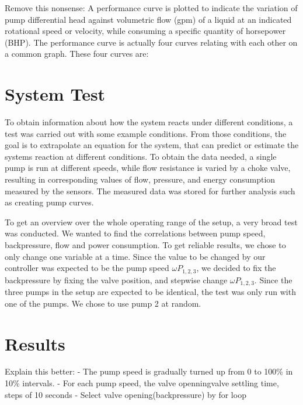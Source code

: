 
Remove this nonsense:
A performance curve is plotted to indicate the variation of pump differential head against volumetric flow (gpm) of a liquid at an indicated rotational speed or velocity, while consuming a specific quantity of horsepower (BHP). The performance curve is actually four curves relating with each other on a common graph. These four curves are:

\section{System Test}\label{sec:system_test} 
To obtain information about how the system reacts under different conditions,
a test was carried out with some example conditions.
From those conditions, the goal is to extrapolate an equation for the system,
that can predict or estimate  the systems reaction at different conditions.
To obtain the data needed,
a single pump is run at different speeds,
while flow resistance is varied by a choke valve,
resulting in corresponding values of flow, pressure, and energy consumption
measured by the sensors.
The measured data was stored for further analysis such as creating pump curves.

To get an overview over the whole operating range of the setup,
a very broad test was conducted.
We wanted to find the correlations between pump speed, backpressure, flow and power consumption.
To get reliable results, we chose to only change one variable at a time.
Since the value to be changed by our controller was expected to be the pump speed $\omega P_{1,2,3}$,
we decided to fix the backpressure by fixing the valve position,
and stepwise change $\omega P_{1,2,3}$.
Since the three pumps in the setup are expected to be identical,
the test was only run with one of the pumps.
We chose to use pump 2 at random.


\section{Results}\label{sec:results}
Explain this better:\newline
- The pump speed is gradually turned up from 0 to 100\% in 10\% intervals. \newline
- For each pump speed, the valve openningvalve settling time, steps of 10 seconds\newline
- Select valve opening(backpressure) by for loop\newline

